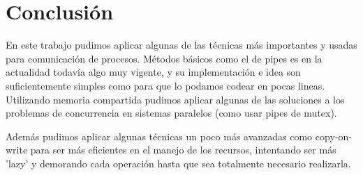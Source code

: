 \section{Conclusión}

En este trabajo pudimos aplicar algunas de las técnicas más importantes y
usadas para comunicación de procesos. Métodos básicos como el de pipes es en la
actualidad todavía algo muy vigente, y su implementación e idea son
suficientemente simples como para que lo podamos codear en pocas lineas.
Utilizando memoria compartida pudimos aplicar algunas de las soluciones a los
problemas de concurrencia en sistemas paralelos (como usar pipes de mutex).

Además pudimos aplicar algunas técnicas un poco más avanzadas como
copy-on-write para ser más eficientes en el manejo de los recursos, intentando
ser más 'lazy' y demorando cada operación hasta que sea totalmente necesario
realizarla.
